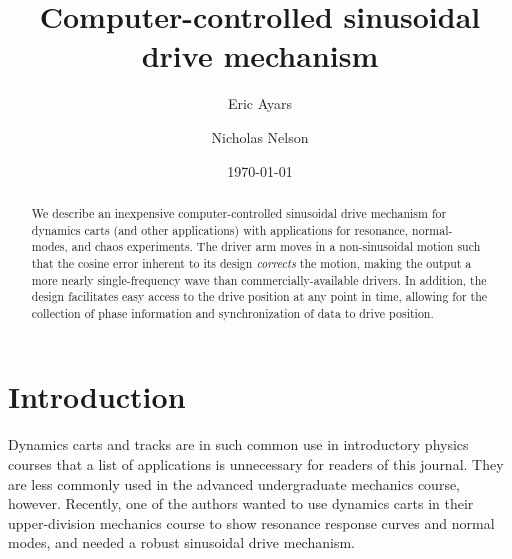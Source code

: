 \documentclass[prb,preprint]{revtex4-1}
\begin{document}
\title{Computer-controlled sinusoidal drive mechanism}

\author{Eric Ayars}
\author{Nicholas Nelson}

\date{\today}

\begin{abstract}
We describe an inexpensive computer-controlled sinusoidal drive mechanism for dynamics carts (and other applications) with applications for resonance, normal-modes, and chaos experiments.
The driver arm moves in a non-sinusoidal motion such that the cosine error inherent to its design \emph{corrects} the motion, making the output a more nearly single-frequency wave than commercially-available drivers.
In addition, the design facilitates easy access to the drive position at any point in time, allowing for the collection of phase information and synchronization of data to drive position.
\end{abstract}

\maketitle

\section{Introduction}

Dynamics carts and tracks are in such common use in introductory physics courses that a list of applications is unnecessary for readers of this journal.
They are less commonly used in the advanced undergraduate mechanics course, however.
Recently, one of the authors wanted to use dynamics carts in their upper-division mechanics course to show resonance response curves and normal modes, and needed a robust sinusoidal drive mechanism.
\end{document}
